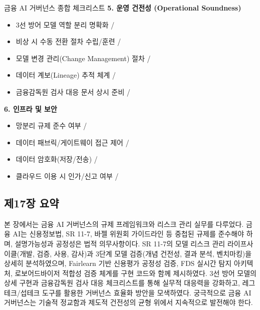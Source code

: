 \begin{practicaltool}{금융 AI 거버넌스 종합 체크리스트}
\textbf{5. 운영 건전성 (Operational Soundness)}
\begin{itemize}
    \item 3선 방어 모델 역할 분리 명확화 \checkmark / \texttimes
    \item 비상 시 수동 전환 절차 수립/훈련 \checkmark / \texttimes
    \item 모델 변경 관리(Change Management) 절차 \checkmark / \texttimes
    \item 데이터 계보(Lineage) 추적 체계 \checkmark / \texttimes
    \item 금융감독원 검사 대응 문서 상시 준비 \checkmark / \texttimes
\end{itemize}

\textbf{6. 인프라 및 보안}
\begin{itemize}
    \item 망분리 규제 준수 여부 \checkmark / \texttimes
    \item 데이터 패브릭/게이트웨이 접근 제어 \checkmark / \texttimes
    \item 데이터 암호화(저장/전송) \checkmark / \texttimes
    \item 클라우드 이용 시 인가/신고 여부 \checkmark / \texttimes
\end{itemize}
\end{practicaltool}

\subsection*{제17장 요약}

본 장에서는 금융 AI 거버넌스의 규제 프레임워크와 리스크 관리 실무를 다루었다. 금융 AI는 신용정보법, SR 11-7, 바젤 위원회 가이드라인 등 중첩된 규제를 준수해야 하며, 설명가능성과 공정성은 법적 의무사항이다. SR 11-7의 모델 리스크 관리 라이프사이클(개발, 검증, 사용, 감사)과 3단계 모델 검증(개념 건전성, 결과 분석, 벤치마킹)을 상세히 분석하였으며, Fairlearn 기반 신용평가 공정성 검증, FDS 실시간 탐지 아키텍처, 로보어드바이저 적합성 검증 체계를 구현 코드와 함께 제시하였다. 3선 방어 모델의 상세 구현과 금융감독원 검사 대응 체크리스트를 통해 실무적 대응력을 강화하고, 레그테크/섭테크 도구를 활용한 거버넌스 효율화 방안을 모색하였다. 궁극적으로 금융 AI 거버넌스는 기술적 정교함과 제도적 건전성의 균형 위에서 지속적으로 발전해야 한다.
